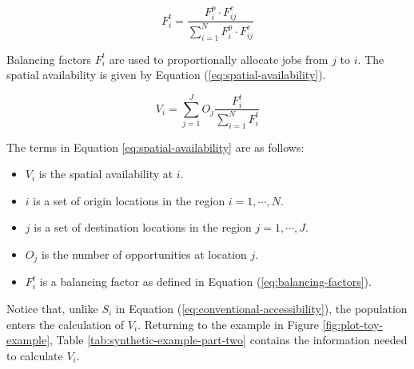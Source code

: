 \documentclass[]{elsarticle} %
\providecommand{\tightlist}{%
  \setlength{\itemsep}{0pt}\setlength{\parskip}{0pt}}
\begin{document}
\begin{equation}
\label{eq:balancing-factors}
F^t_i = \frac{F^p_{i} \cdot F^c_{ij}}{\sum_{i=1}^N F^p_{i} \cdot F^c_{ij}}
\end{equation}

Balancing factors \(F^t_i\) are used to proportionally allocate jobs
from \(j\) to \(i\). The spatial availability is given by Equation
(\ref{eq:spatial-availability}).

\begin{equation}
\label{eq:spatial-availability}
V_{i} = \sum_{j=1}^J O_j\frac{F^t_{i}}{\sum_{i=1}^N F^t_{i}}
\end{equation}

The terms in Equation \ref{eq:spatial-availability} are as follows:

\begin{itemize}
\tightlist
\item
  \(V_{i}\) is the spatial availability at \(i\).
\item
  \(i\) is a set of origin locations in the region \(i = 1,\cdots, N\).
\item
  \(j\) is a set of destination locations in the region
  \(j = 1,\cdots,J\).
\item
  \(O_j\) is the number of opportunities at location \(j\).
\item
  \(F^t_{i}\) is a balancing factor as defined in Equation
  (\ref{eq:balancing-factors}).
\end{itemize}

Notice that, unlike \(S_i\) in Equation
(\ref{eq:conventional-accessibility}), the population enters the
calculation of \(V_{i}\). Returning to the example in Figure
\ref{fig:plot-toy-example}, Table \ref{tab:synthetic-example-part-two}
contains the information needed to calculate \(V_i\).

 
  \providecommand{\huxb}[2]{\arrayrulecolor[RGB]{#1}\global\arrayrulewidth=#2pt}
  \providecommand{\huxvb}[2]{\color[RGB]{#1}\vrule width #2pt}
  \providecommand{\huxtpad}[1]{\rule{0pt}{#1}}
  \providecommand{\huxbpad}[1]{\rule[-#1]{0pt}{#1}}
\end{document}
